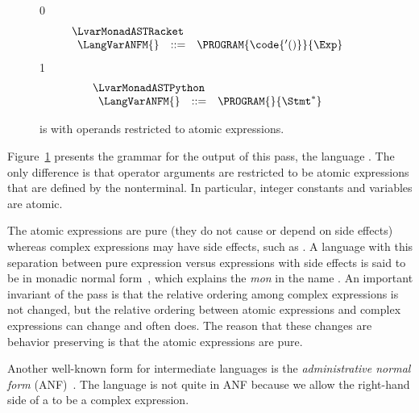 \documentclass[7x10]{TimesAPriori_MIT}%
\def\racketEd{0}
\def\pythonEd{1}
\def\edition{0}
\numberwithin{theorem}{chapter}
\numberwithin{definition}{chapter}
\numberwithin{equation}{chapter}
\begin{document}
\begin{figure}[tp]
\centering
\begin{tcolorbox}[colback=white]
{\if\edition\racketEd
\[
\begin{array}{l}
  \LvarMonadASTRacket \\
\begin{array}{rcl}
\LangVarANFM{}  &::=& \PROGRAM{\code{'()}}{\Exp}
\end{array}
\end{array}
\]
\fi}
{\if\edition\pythonEd
\[
\begin{array}{l}
  \LvarMonadASTPython \\
\begin{array}{rcl}
\LangVarANFM{}  &::=& \PROGRAM{}{\Stmt^{*}}
\end{array}
\end{array}
\]
\fi}  
\end{tcolorbox}

\caption{\LangVarANF{} is \LangVar{} with operands restricted to
  atomic expressions.}
\label{fig:Lvar-anf-syntax}
\end{figure}

Figure~\ref{fig:Lvar-anf-syntax} presents the grammar for the output
of this pass, the language \LangVarANF{}. The only difference is that
operator arguments are restricted to be atomic expressions that are
defined by the \Atm{} nonterminal. In particular, integer constants
and variables are atomic.

The atomic expressions are pure (they do not cause or depend on side
effects) whereas complex expressions may have side effects, such as
\READ{}.  A language with this separation between pure expression
versus expressions with side effects is said to be in monadic normal
form~\citep{Moggi:1991in,Danvy:2003fk}, which explains the \textit{mon}
in the name \LangVarANF{}. An important invariant of the
 pass is that the relative ordering
among complex expressions is not changed, but the relative ordering
between atomic expressions and complex expressions can change and
often does. The reason that these changes are behavior preserving is
that the atomic expressions are pure.

Another well-known form for intermediate languages is the
\emph{administrative normal form}
(ANF)~\citep{Danvy:1991fk,Flanagan:1993cg}.
 
%
The \LangVarANF{} language is not quite in ANF because we allow the
right-hand side of a  to be a complex expression.
\end{document}
